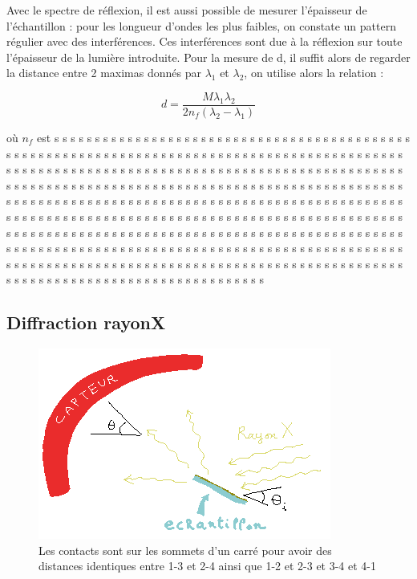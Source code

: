 \documentclass[a4paper,12pt,oneside]{article}
\def \be {\begin{equation}}
\def \ee {\end{equation}}
\begin{document}
Avec le spectre de réflexion, il est aussi possible de mesurer l'épaisseur de l'échantillon : pour les longueur d'ondes les plus faibles, on constate un pattern régulier avec des interférences. Ces interférences sont due à la réflexion sur toute l'épaisseur de la lumière introduite. Pour la mesure de d, il suffit alors de regarder la distance entre 2 maximas donnés par $\lambda_1$ et $\lambda_2$, on utilise alors la relation :

\be
	d=\frac{M\lambda_1 \lambda_2}{2 n_f (\lambda_2 - \lambda_1)}
\ee


où $n_f$ est s s s s s s s s s s s s s s s s s s s s s s s s s s s s s s s s s s s s s s s s s s s s s s s s s s s s s s s s s s s s s s s s s s s s s s s s s s s s s s s s s s s s s s s s s s s s s s s s s s s s s s s s s s s s s s s s s s s s s s s s s s s s s s s s s s s s s s s s s s s s s s s s s s s s s s s s s s s s s s s s s s s s s s s s s s s s s s s s s s s s s s s s s s s s s s s s s s s s s s s s s s s s s s s s s s s s s s s s s s s s s s s s s s s s s s s s s s s s s s s s s s s s s s s s s s s s s s s s s s s s s s s s s s s s s s s s s s s s s s s s s s s s s s s s s s s s s s s s s s s s s s s s s s s s s s s s s s s s s s s s s s s s s s s s s s s s s s s s s s s s s s s s s s s s s s s s s s s s s s s s s s s s s s s s s s s s s s s s s s s s s s s s s s s s s s s s s s s s s s s s s s s s s s s s s s s s s s s s s s s s s s s s s s s s s s s s s s s s s s s s s s s s s s s s s s s s s s s s s s s s s s s s s s s s 





\subsection{Diffraction rayonX}

		\begin{figure}[h!]
			\begin{center}
			\includegraphics[width=0.8\linewidth,angle=0]{./figures/illustration_rayon_X.png}
			\caption{Les contacts sont sur les sommets d'un carré pour avoir des distances identiques entre 1-3 et 2-4 ainsi que 1-2 et 2-3 et 3-4 et 4-1} \label{fig:illustration_rayon_X}
			\end{center}
		\end{figure}
\end{document}
